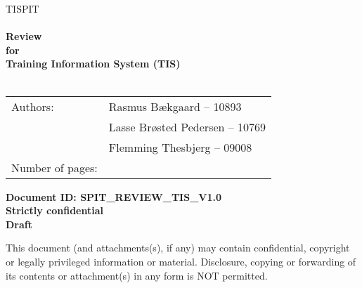 \documentclass[Main]{subfiles}
\begin{document}
\begin{center}

\textsc{\Large TISPIT}\\[0.5cm]


\HRule \\[0.4cm]

{ \huge \bfseries Review}\\[0.4cm]
{ \huge \bfseries for}\\[0.4cm] 
{ \huge \bfseries Training Information System (TIS)}\\[0.4cm]

\HRule \\[1.5cm]

\begin{tabular}{p{}|p{}}
\hline 
Authors: & Rasmus Bækgaard -- 10893\\ &Lasse Brøsted Pedersen -- 10769\\ &Flemming Thesbjerg -- 09008\\ 
\hline 
Number of pages: & \pageref{LastPage} \\
\hline 
\end{tabular} \vspace{40pt}

\textbf{\Large Document ID: SPIT\_REVIEW\_TIS\_V1.0}\\
\textbf{\Large Strictly confidential}\\
\textbf{\Large Draft}

This document (and attachments(s), if any) may contain confidential, copyright or legally privileged information or material.
Disclosure, copying or forwarding of its contents or attachment(s) in any form is NOT permitted.
\end{center}
\end{document}
